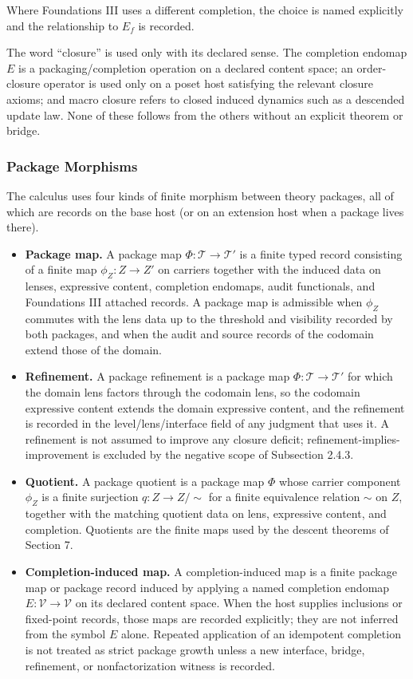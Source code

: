 \documentclass[11pt]{article}
\providecommand{\tightlist}{}
\theoremstyle{definition}
\begin{document}
Where Foundations III uses a different completion, the choice is named explicitly and the relationship to \(E_f\) is recorded.

The word ``closure'' is used only with its declared sense. The completion endomap \(E\) is a packaging/completion operation on a declared content space; an order-closure operator is used only on a poset host satisfying the relevant closure axioms; and macro closure refers to closed induced dynamics such as a descended update law. None of these follows from the others without an explicit theorem or bridge.

\subsubsection{Package Morphisms}

The calculus uses four kinds of finite morphism between theory packages, all of which are records on the base host (or on an extension host when a package lives there).

\begin{itemize}
\tightlist
\item
  \textbf{Package map.} A package map \(\Phi:\mathcal T\to\mathcal T'\) is a finite typed record consisting of a finite map \(\phi_Z:Z\to Z'\) on carriers together with the induced data on lenses, expressive content, completion endomaps, audit functionals, and Foundations III attached records. A package map is admissible when \(\phi_Z\) commutes with the lens data up to the threshold and visibility recorded by both packages, and when the audit and source records of the codomain extend those of the domain.
\item
  \textbf{Refinement.} A package refinement is a package map \(\Phi:\mathcal T\to\mathcal T'\) for which the domain lens factors through the codomain lens, so the codomain expressive content extends the domain expressive content, and the refinement is recorded in the level/lens/interface field of any judgment that uses it. A refinement is not assumed to improve any closure deficit; refinement-implies-improvement is excluded by the negative scope of Subsection 2.4.3.
\item
  \textbf{Quotient.} A package quotient is a package map \(\Phi\) whose carrier component \(\phi_Z\) is a finite surjection \(q:Z\to Z/\!\sim\) for a finite equivalence relation \(\sim\) on \(Z\), together with the matching quotient data on lens, expressive content, and completion. Quotients are the finite maps used by the descent theorems of Section 7.
\item
  \textbf{Completion-induced map.} A completion-induced map is a finite package map or package record induced by applying a named completion endomap \(E:\mathcal V\to\mathcal V\) on its declared content space. When the host supplies inclusions or fixed-point records, those maps are recorded explicitly; they are not inferred from the symbol \(E\) alone. Repeated application of an idempotent completion is not treated as strict package growth unless a new interface, bridge, refinement, or nonfactorization witness is recorded.
\end{itemize}
\end{document}
